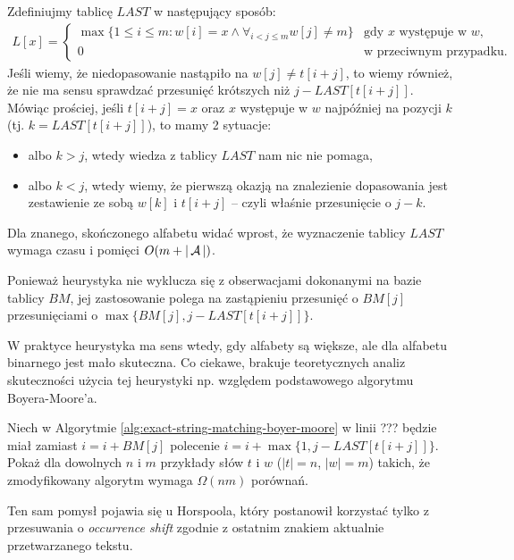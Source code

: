 Zdefiniujmy tablicę $LAST$ w następujący sposób:
\begin{align*}
  L[x] =
  \begin{cases}
    \max \{1 \le i \le m: w[i] = x \land \forall_{i < j \le m} w[j] \neq m\} & \text{gdy $x$ występuje w $w$}, \\
    0 & \text{w przeciwnym przypadku}.
  \end{cases}
\end{align*}
Jeśli wiemy, że niedopasowanie nastąpiło na $w[j] \neq t[i + j]$, to wiemy również, że nie ma sensu sprawdzać przesunięć krótszych niż $j - LAST[t[i + j]]$. Mówiąc prościej, jeśli $t[i + j] = x$ oraz $x$ występuje w $w$ najpóźniej na pozycji $k$ (tj. $k = LAST[t[i + j]]$), to mamy 2 sytuacje:
\begin{itemize}
  \item albo $k > j$, wtedy wiedza z tablicy $LAST$ nam nic nie pomaga,
  \item albo $k < j$, wtedy wiemy, że pierwszą okazją na znalezienie dopasowania jest zestawienie ze sobą $w[k]$ i $t[i + j]$ -- czyli właśnie przesunięcie o $j - k$.
\end{itemize}
Dla znanego, skończonego alfabetu widać wprost, że wyznaczenie tablicy $LAST$ wymaga czasu i pomięci $O(m + |\operatorname{\mathcal{A}}|)$.

Ponieważ heurystyka nie wyklucza się z obserwacjami dokonanymi na bazie tablicy $BM$, jej zastosowanie polega na zastąpieniu przesunięć o $BM[j]$ przesunięciami o $\max\{BM[j], j - LAST[t[i + j]]\}$.

W praktyce heurystyka ma sens wtedy, gdy alfabety są większe, ale dla alfabetu binarnego jest mało skuteczna.
Co ciekawe, brakuje teoretycznych analiz skuteczności użycia tej heurystyki np. względem podstawowego algorytmu Boyera-Moore'a.

\begin{problem}{}{}
  Niech w Algorytmie \ref{alg:exact-string-matching-boyer-moore} w linii ??? będzie miał zamiast $i = i + BM[j]$ polecenie $i = i + \max\{1, j - LAST[t[i + j]]\}$.
  Pokaż dla dowolnych $n$ i $m$ przykłady słów $t$ i $w$ ($|t| = n$, $|w| = m$) takich, że zmodyfikowany algorytm wymaga $\Omega(n m)$ porównań.
\end{problem}

Ten sam pomysł pojawia się u Horspoola, który postanowił korzystać tylko z przesuwania o \emph{occurrence shift} zgodnie z ostatnim znakiem aktualnie przetwarzanego tekstu.

\begin{code}
\inputminted{python}{code/exact-string-matching/horspool.py}
\label{alg:exact-string-matching-horspool}
\end{code}

